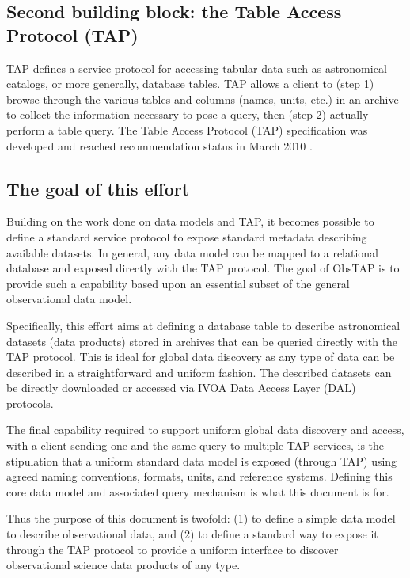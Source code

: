 \documentclass[11pt,a4paper]{ivoa}
\begin{document}
\subsection{Second building block: the Table Access Protocol (TAP)}
TAP defines a service protocol for accessing tabular data such as astronomical catalogs, or more generally, database
tables.  TAP allows a client to (step 1) browse through the various tables and columns (names, units, etc.) in an
archive to collect the information necessary to pose a query, then (step 2) actually perform a table query.  The Table
Access Protocol (TAP) specification was developed and reached recommendation status in March 2010
\citep{2010ivoa.spec.0327D}.

\subsection{The goal of this effort}
Building on the work done on data models and TAP, it becomes possible to define a standard service protocol to expose
standard metadata describing available datasets.  In general, any data model can be mapped to a relational database and
exposed directly with the TAP protocol.  The goal of ObsTAP is to provide such a capability based upon an essential
subset of the general observational data model.

Specifically, this effort aims at defining a database table to describe astronomical datasets (data products) stored in
archives that can be queried directly with the TAP protocol.  This is ideal for global data discovery as any type of
data can be described in a straightforward and uniform fashion.  The described datasets can be directly downloaded or
accessed via IVOA Data Access Layer (DAL) protocols.

The final capability required to support uniform global data discovery and access, with a client sending one and the
same query to multiple TAP services, is the stipulation that a uniform standard data model is exposed (through TAP)
using agreed naming conventions, formats, units, and reference systems.  Defining this core data model and associated
query mechanism is what this document is for.

Thus the purpose of this document is twofold: (1) to define a simple data model to describe observational data, and (2)
to define a standard way to expose it through the TAP protocol to provide a uniform interface to discover observational
science data products of any type.
\end{document}
